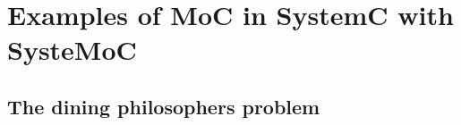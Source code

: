 


\section{Examples of MoC in SystemC with SysteMoC}\label{systemoc-examples}

\subsection{The dining philosophers problem}

